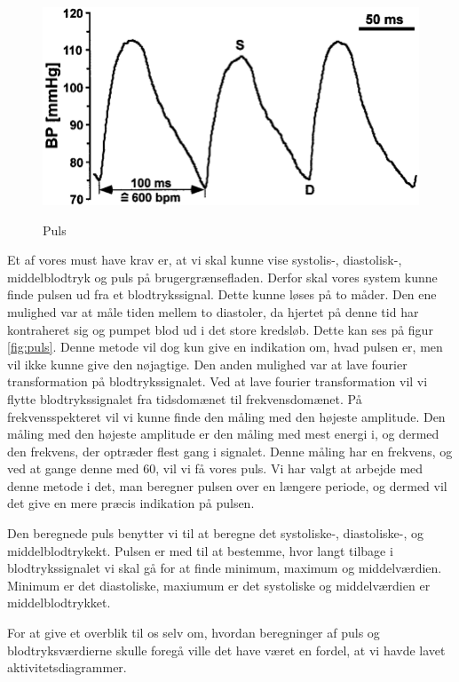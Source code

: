 \begin{figure}[h!]
	\centering
	\includegraphics[width=0.5\linewidth]{Arkitektur_og_design/Softwarearkitektur/puls}
	\label{fig:puls}
	\caption{Puls}
\end{figure}

\clearpage

Et af vores must have krav er, at vi skal kunne vise systolis-, diastolisk-, middelblodtryk og puls på brugergrænsefladen. Derfor skal vores system kunne finde pulsen ud fra et blodtrykssignal. Dette kunne løses på to måder. Den ene mulighed var at måle tiden mellem to diastoler, da hjertet på denne tid har kontraheret sig og pumpet blod ud i det store kredsløb. Dette kan ses på figur \vref{fig:puls}. Denne metode vil dog kun give en indikation om, hvad pulsen er, men vil ikke kunne give den nøjagtige.
Den anden mulighed var at lave fourier transformation på blodtrykssignalet. Ved at lave fourier transformation vil vi flytte blodtrykssignalet fra tidsdomænet til frekvensdomænet. På frekvensspekteret vil vi kunne finde den måling med den højeste amplitude. Den måling med den højeste amplitude er den måling med mest energi i, og dermed den frekvens, der optræder flest gang i signalet. Denne måling har en frekvens, og ved at gange denne med 60, vil vi få vores puls. Vi har valgt at arbejde med denne metode i det, man beregner pulsen over en længere periode, og dermed vil det give en mere præcis indikation på pulsen.

Den beregnede puls benytter vi til at beregne det systoliske-, diastoliske-, og middelblodtrykekt. Pulsen er med til at bestemme, hvor langt tilbage i blodtrykssignalet vi skal gå for at finde minimum, maximum og middelværdien. Minimum er det diastoliske, maxiumum er det systoliske og middelværdien er middelblodtrykket.

For at give et overblik til os selv om, hvordan beregninger af puls og blodtryksværdierne skulle foregå ville det have været en fordel, at vi havde lavet aktivitetsdiagrammer.
